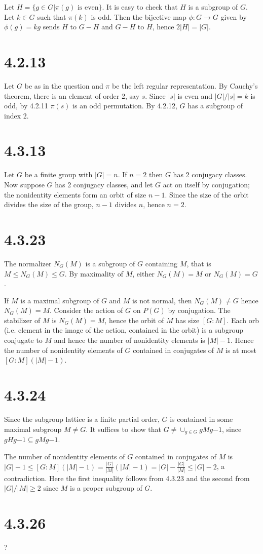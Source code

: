 \documentclass{article}
\def\inv{{-1}}
\begin{document}
Let $H = \{g \in G | \pi(g) \textrm{ is even}\}$. It is easy to check that $H$ is a subgroup of $G$. Let $k \in G$ such that $\pi(k)$ is odd. Then the bijective map $\phi: G \to G$ given by $\phi(g) = kg$ sends $H$ to $G - H$ and $G - H$ to $H$, hence $2|H| = |G|$.

\section*{4.2.13}

Let $G$ be as in the question and $\pi$ be the left regular representation. By Cauchy's theorem, there is an element of order 2, say $s$. Since $|s|$ is even and $|G| / |s| = k$ is odd, by 4.2.11 $\pi(s)$ is an odd permutation. By 4.2.12, $G$ has a subgroup of index 2.

\section*{4.3.13}

Let $G$ be a finite group with $|G| = n$. If $n = 2$ then $G$ has 2 conjugacy classes. Now suppose $G$ has 2 conjugacy classes, and let $G$ act on itself by conjugation; the nonidentity elements form an orbit of size $n-1$. Since the size of the orbit divides the size of the group, $n-1$ divides $n$, hence $n = 2$.

\section*{4.3.23}

The normalizer $N_G(M)$ is a subgroup of $G$ containing $M$, that is $M \le N_G(M) \le G$. By maximality of $M$, either $N_G(M) = M$ or $N_G(M) = G$. 

If $M$ is a maximal subgroup of $G$ and $M$ is not normal, then $N_G(M) \ne G$ hence $N_G(M) = M$. Consider the action of $G$ on $P(G)$ by conjugation. The stabilizer of $M$ is $N_G(M) = M$, hence the orbit of $M$ has size $[G:M]$. Each orb (i.e. element in the image of the action, contained in the orbit) is a subgroup conjugate to $M$ and hence the number of nonidentity elements is $|M|-1$. Hence the number of nonidentity elements of $G$ contained in conjugates of $M$ is at most $[G:M] (|M|-1)$.
\section*{4.3.24}

Since the subgroup lattice is a finite partial order, $G$ is contained in some maximal subgroup $M \ne G$. It suffices to show that $G \ne \cup_{g \in G} gMg\inv$, since $gHg\inv \subseteq gMg\inv$.

The number of nonidentity elements of $G$ contained in conjugates of $M$ is $|G| - 1 \le [G:M] (|M|-1) = \frac{|G|}{|M|}(|M|-1) = |G| - \frac{|G|}{|M|} \le |G| - 2$, a contradiction. Here the first inequality follows from 4.3.23 and the second from $|G| / |M| \ge 2$ since $M$ is a proper subgroup of $G$.

\section*{4.3.26}

?
\end{document}
